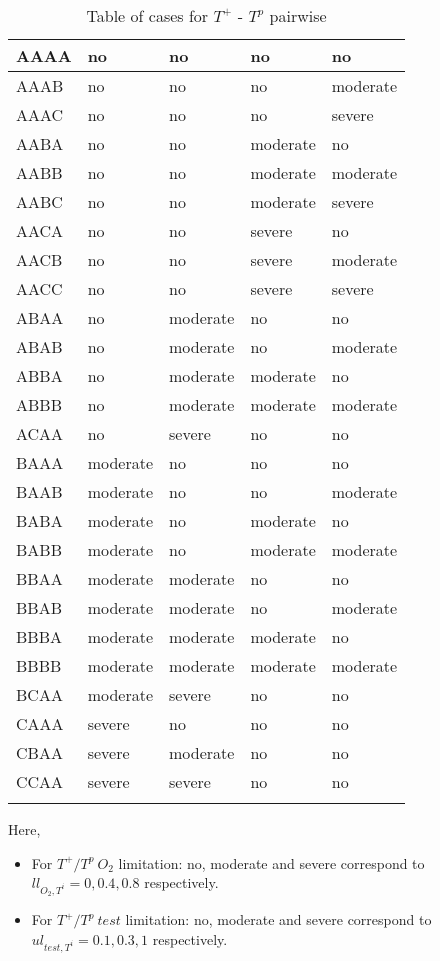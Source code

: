 \begin{longtable}[c]{|l|l|l|l|l|}
  \endlastfoot
  AAAA & no & no & no & no \\ \hline
  AAAB & no & no & no & moderate \\ \hline
  AAAC & no & no & no & severe \\ \hline
  AABA & no & no & moderate & no \\ \hline
  AABB & no & no & moderate & moderate \\ \hline
  AABC & no & no & moderate & severe \\ \hline
  AACA & no & no & severe & no \\ \hline
  AACB & no & no & severe & moderate \\ \hline
  AACC & no & no & severe & severe \\ \hline
  ABAA & no & moderate & no & no \\ \hline
  ABAB & no & moderate & no & moderate \\ \hline
  ABBA & no & moderate & moderate & no \\ \hline
  ABBB & no & moderate & moderate & moderate \\ \hline
  ACAA & no & severe & no & no \\ \hline
  BAAA & moderate & no & no & no \\ \hline
  BAAB & moderate & no & no & moderate \\ \hline
  BABA & moderate & no & moderate & no \\ \hline
  BABB & moderate & no & moderate & moderate \\ \hline
  BBAA & moderate & moderate & no & no \\ \hline
  BBAB & moderate & moderate & no & moderate \\ \hline
  BBBA & moderate & moderate & moderate & no \\ \hline
  BBBB & moderate & moderate & moderate & moderate \\ \hline
  BCAA & moderate & severe & no & no \\ \hline
  CAAA & severe & no & no & no \\ \hline
  CBAA & severe & moderate & no & no \\ \hline
  CCAA & severe & severe & no & no \\ \hline

  \caption{Table of cases for $T^+$ - $T^p$ pairwise}
  \label{tab_Tpro-Tneg_cases}

\end{longtable}

Here,
\begin{itemize}
  \item For $T^+/T^p\ O_2$ limitation: no, moderate and severe correspond to $ll_{O_2,T^i}=0, 0.4, 0.8$ respectively.
  \item For $T^+/T^p\ test$ limitation: no, moderate and severe correspond to $ul_{test,T^i}=0.1, 0.3, 1$ respectively.
\end{itemize}

